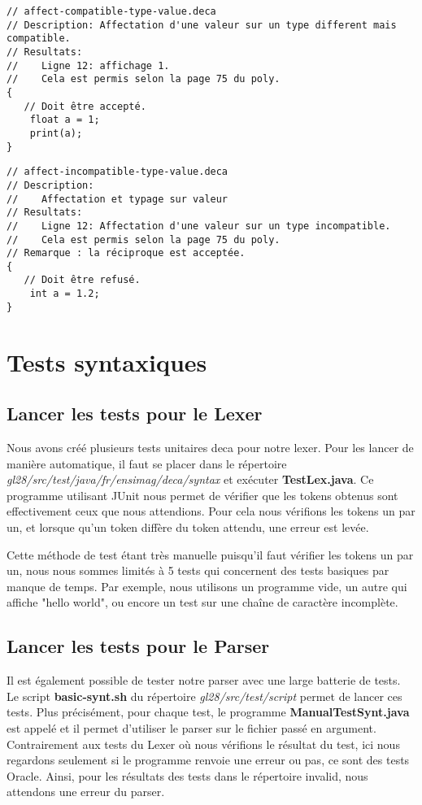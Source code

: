 \documentclass[12pt, a4paper, one side]{article}
\begin{document}
\begin{lstlisting}
// affect-compatible-type-value.deca
// Description: Affectation d'une valeur sur un type different mais compatible.
// Resultats:
//    Ligne 12: affichage 1.
//    Cela est permis selon la page 75 du poly.
{
   // Doit être accepté.
    float a = 1;
    print(a);
}
\end{lstlisting}

\begin{lstlisting}
// affect-incompatible-type-value.deca
// Description:
//    Affectation et typage sur valeur
// Resultats:
//    Ligne 12: Affectation d'une valeur sur un type incompatible.
//    Cela est permis selon la page 75 du poly.
// Remarque : la réciproque est acceptée.
{
   // Doit être refusé.
    int a = 1.2;
}
\end{lstlisting}

\section{Tests syntaxiques}
\subsection{Lancer les tests pour le Lexer}
Nous avons créé plusieurs tests unitaires deca pour notre lexer. Pour les lancer de manière automatique, il faut se placer dans le répertoire \newline
\textit{gl28/src/test/java/fr/ensimag/deca/syntax} et exécuter \textbf{TestLex.java}. Ce programme utilisant JUnit nous permet de vérifier que les tokens obtenus sont effectivement ceux que nous attendions. Pour cela nous vérifions les tokens un par un, et lorsque qu'un token diffère du token attendu, une erreur est levée.

Cette méthode de test étant très manuelle puisqu'il faut vérifier les tokens un par un, nous nous sommes limités à 5 tests qui concernent des tests basiques par manque de temps. Par exemple, nous utilisons un programme vide, un autre qui affiche "hello world", ou encore un test sur une chaîne de caractère incomplète.

\subsection{Lancer les tests pour le Parser}
Il est également possible de tester notre parser avec une large batterie de tests. Le script \textbf{basic-synt.sh} du répertoire \textit{gl28/src/test/script} permet de lancer ces tests. Plus précisément, pour chaque test, le programme \textbf{ManualTestSynt.java} est appelé et il permet d'utiliser le parser sur le fichier passé en argument. Contrairement aux tests du Lexer où nous vérifions le résultat du test, ici nous regardons seulement si le programme renvoie une erreur ou pas, ce sont des tests Oracle. Ainsi, pour les résultats des tests dans le répertoire invalid, nous attendons une erreur du parser.
\end{document}

